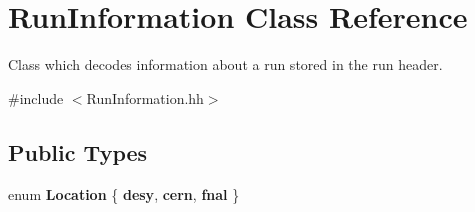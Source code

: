 \section{Run\-Information Class Reference}
\label{classRunInformation}


Class which decodes information about a run stored in the run header.  




{\ttfamily \#include $<$Run\-Information.\-hh$>$}

\subsection*{Public Types}
\begin{DoxyCompactItemize}
\item 
enum {\bfseries Location} \{ {\bfseries desy}, 
{\bfseries cern}, 
{\bfseries fnal}
 \}
\end{DoxyCompactItemize}
